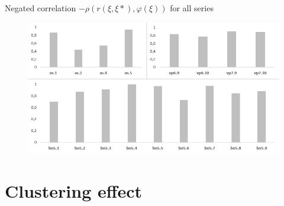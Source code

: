 \documentclass[aspectratio=169,xcolor=dvipsnames]{beamer}
\begin{document}
\begin{frame}{Negated correlation $-\rho(r(\xi, \xi*),\varphi(\xi))$ for all series}
    \begin{figure}
    \includegraphics[scale=0.8]{ro}
    \end{figure}
\end{frame}

\section{Clustering effect}
\end{document}
